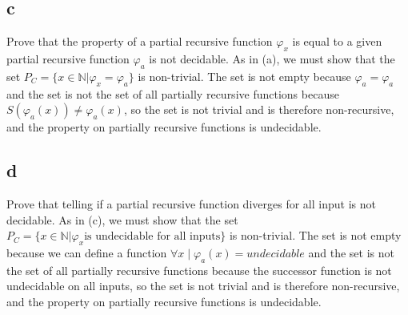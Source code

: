 \documentclass[12pt]{article}
\begin{document}
\subsection*{c} 
Prove that the property of a partial recursive function $\varphi_x$ is equal to a given partial recursive function $\varphi_a$ is not decidable.  As in (a), we must show that the set $P_C = \{x \in \mathbb{N} | \varphi_x = \varphi_a \}$ is non-trivial.  The set is not empty because $\varphi_a = \varphi_a$ and the set is not the set of all partially recursive functions because $S (\varphi_a(x)) \neq \varphi_a(x)$, so the set is not trivial and is therefore non-recursive, and the property on partially recursive functions is undecidable.  
\subsection*{d}
Prove that telling if a partial recursive function diverges for all input is not decidable.  As in (c), we must show that the set $P_C = \{x \in \mathbb{N} | \varphi_x \text{is undecidable for all inputs} \}$ is non-trivial.  The set is not empty because we can define a function $\forall x \mid \varphi_a(x) = undecidable$ and the set is not the set of all partially recursive functions because the successor function is not undecidable on all inputs, so the set is not trivial and is therefore non-recursive, and the property on partially recursive functions is undecidable.  
\end{document}
